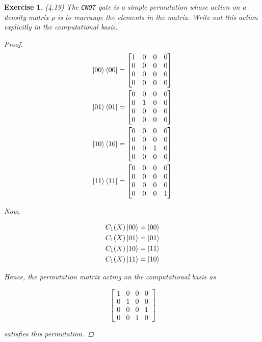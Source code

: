 \documentclass[11pt]{article}
\newcommand\0{\mathbf{0}}
\newcommand\<{\langle}
\renewcommand\>{\rangle}
\newtheorem{exercise}[theorem]{Exercise}
\begin{document}
\begin{exercise} (4.19) The \texttt{CNOT} gate is a simple permutation whose action on a density matrix $\rho$ is to rearrange the elements in the matrix. Write out this action explicitly in the computational basis.

\begin{proof}
	\begin{align*}
	\ket{00}\bra{00}  &= \begin{bmatrix}
 1 & 0 & 0 & 0 \\ 0 & 0 & 0 & 0 \\ 	0 & 0 & 0 & 0 \\ 0 & 0 & 0 & 0 
 \end{bmatrix} \\
 \ket{01}\bra{01}  &= \begin{bmatrix}
 0 & 0 & 0 & 0 \\  0 & 1 & 0 & 0 \\0 & 0 & 0 & 0 \\ 0 & 0 & 0 & 0 
 \end{bmatrix}\\
\ket{10}\bra{10}  &= \begin{bmatrix}
 0 & 0 & 0 & 0 \\  0 & 0 & 0 & 0 \\0 & 0 & 1 & 0 \\ 0 & 0 & 0 & 0  	
 \end{bmatrix} \\
 \ket{11}\bra{11}  &= \begin{bmatrix}
 0 & 0 & 0 & 0 \\  0 & 0 & 0 & 0 \\0 & 0 & 0 & 0 \\ 0 & 0 & 0 & 1
 \end{bmatrix}
	\end{align*}

Now, 

\begin{align*}
C_1(X)\ket{00} = \ket{00} \\
C_1(X)\ket{01} = \ket{01} \\
C_1(X)\ket{10} = \ket{11} \\
C_1(X)\ket{11} = \ket{10}
\end{align*}

Hence, the permutation matrix acting on the computational basis as

$$
\begin{bmatrix}
1 & 0 & 0 & 0 \\
0 & 1 & 0 & 0 \\
0 & 0 & 0 & 1 \\
0 & 0 & 1 & 0	
\end{bmatrix}
$$

satisfies this permutation. 
\end{proof}
\end{exercise}
\end{document}
